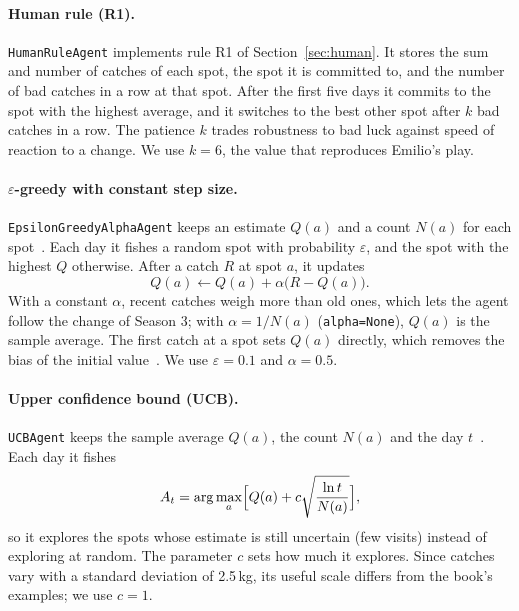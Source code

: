 \documentclass[11pt,a4paper]{article}
\begin{document}
\paragraph{Human rule (R1).} \texttt{HumanRuleAgent} implements rule R1 of
Section~\ref{sec:human}. It stores the sum and number of catches of each spot,
the spot it is committed to, and the number of bad catches in a row at that
spot. After the first five days it commits to the spot with the highest average,
and it switches to the best other spot after $k$ bad catches in a row. The
patience $k$ trades robustness to bad luck against speed of reaction to a
change. We use $k=6$, the value that reproduces Emilio's play.

\paragraph{$\varepsilon$-greedy with constant step size.}
\texttt{EpsilonGreedyAlphaAgent} keeps an estimate $Q(a)$ and a count $N(a)$ for
each spot~\cite[Sec.~2.2--2.5]{sutton}. Each day it fishes a random spot with
probability $\varepsilon$, and the spot with the highest $Q$ otherwise. After a
catch $R$ at spot $a$, it updates
\begin{equation}
  Q(a) \leftarrow Q(a) + \alpha \bigl( R - Q(a) \bigr).
\end{equation}
With a constant $\alpha$, recent catches weigh more than old ones, which lets
the agent follow the change of Season 3; with $\alpha = 1/N(a)$
(\texttt{alpha=None}), $Q(a)$ is the sample average. The first catch at a spot
sets $Q(a)$ directly, which removes the bias of the initial
value~\cite[Sec.~2.6]{sutton}. We use $\varepsilon = 0.1$ and $\alpha = 0.5$.

\paragraph{Upper confidence bound (UCB).} \texttt{UCBAgent} keeps the sample
average $Q(a)$, the count $N(a)$ and the day $t$~\cite[Sec.~2.7]{sutton}. Each
day it fishes
\begin{equation}
  A_t = \arg\max_a \Bigl[ Q(a) + c \sqrt{\frac{\ln t}{N(a)}} \Bigr],
\end{equation}
so it explores the spots whose estimate is still uncertain (few visits) instead
of exploring at random. The parameter $c$ sets how much it explores. Since
catches vary with a standard deviation of 2.5\,kg, its useful scale differs
from the book's examples; we use $c = 1$.
\end{document}
